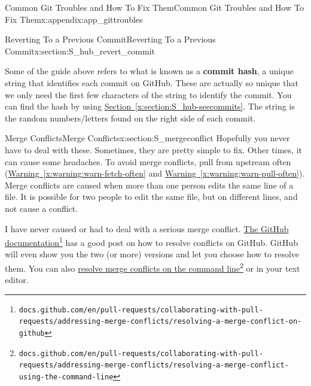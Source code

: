 \documentclass[oneside,10pt,]{book}
\newcommand{\xreffont}{\relax}
\newcommand{\terminology}[1]{\textbf{#1}}
\begin{document}
\begin{appendixptx}{Common Git Troubles and How To Fix Them}{}{Common Git Troubles and How To Fix Them}{}{}{x:appendix:app_gittroubles}
\begin{sectionptx}{Reverting To a Previous Commit}{}{Reverting To a Previous Commit}{}{}{x:section:S_hub_revert_commit}
\par
Some of the guide above refers to what is known as a \terminology{commit hash}, a unique string that identifies each commit on GitHub. These are actually so unique that we only need the first few characters of the string to identify the commit. You can find the hash by using \hyperref[x:section:S_hub-seecommits]{Section~{\xreffont\ref{x:section:S_hub-seecommits}}}. The string is the random numbers\slash{}letters found on the right side of each commit.%
\end{sectionptx}
%
%
\typeout{************************************************}
\typeout{************************************************}
%
\begin{sectionptx}{Merge Conflicts}{}{Merge Conflicts}{}{}{x:section:S_mergeconflict}
Hopefully you never have to deal with these. Sometimes, they are pretty simple to fix. Other times, it can cause some headaches. To avoid merge conflicts, pull from upstream often (\hyperref[x:warning:warn-fetch-often]{Warning~{\xreffont\ref{x:warning:warn-fetch-often}}} and \hyperref[x:warning:warn-pull-often]{Warning~{\xreffont\ref{x:warning:warn-pull-often}}}). Merge conflicts are caused when more than one person edits the same line of a file. It is possible for two people to edit the same file, but on different lines, and not cause a conflict.%
\par
I have never caused or had to deal with a serious merge conflict. \href{https://docs.github.com/en/pull-requests/collaborating-with-pull-requests/addressing-merge-conflicts/resolving-a-merge-conflict-on-github}{The GitHub documentation}\footnote{\nolinkurl{docs.github.com/en/pull-requests/collaborating-with-pull-requests/addressing-merge-conflicts/resolving-a-merge-conflict-on-github}\label{g:fn:idm479019896}} has a good post on how to resolve conflicts on GitHub. GitHub will even show you the two (or more) versions and let you choose how to resolve them. You can also \href{https://docs.github.com/en/pull-requests/collaborating-with-pull-requests/addressing-merge-conflicts/resolving-a-merge-conflict-using-the-command-line}{resolve merge conflicts on the command line}\footnote{\nolinkurl{docs.github.com/en/pull-requests/collaborating-with-pull-requests/addressing-merge-conflicts/resolving-a-merge-conflict-using-the-command-line}\label{g:fn:idm479020408}} or in your text editor.%
\par

\end{sectionptx}
\end{appendixptx}
\end{document}
